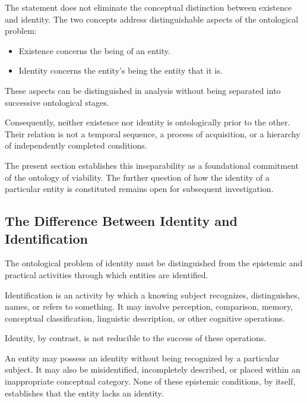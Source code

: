 The statement does not eliminate the conceptual
distinction between existence and identity. The two
concepts address distinguishable aspects of the
ontological problem:

\begin{itemize}
    \item Existence concerns the being of an entity.
    \item Identity concerns the entity's being the entity
    that it is.
\end{itemize}

These aspects can be distinguished in analysis without
being separated into successive ontological stages.

Consequently, neither existence nor identity is
ontologically prior to the other. Their relation is not
a temporal sequence, a process of acquisition, or a
hierarchy of independently completed conditions.

The present section establishes this inseparability as
a foundational commitment of the ontology of viability.
The further question of how the identity of a particular
entity is constituted remains open for subsequent
investigation.



\subsection{The Difference Between Identity and Identification}
\label{subsec:identity-and-identification}

The ontological problem of identity must be distinguished
from the epistemic and practical activities through which
entities are identified.

Identification is an activity by which a knowing subject
recognizes, distinguishes, names, or refers to something.
It may involve perception, comparison, memory, conceptual
classification, linguistic description, or other
cognitive operations.

Identity, by contrast, is not reducible to the success
of these operations.

An entity may possess an identity without being
recognized by a particular subject. It may also be
misidentified, incompletely described, or placed within
an inappropriate conceptual category. None of these
epistemic conditions, by itself, establishes that the
entity lacks an identity.

